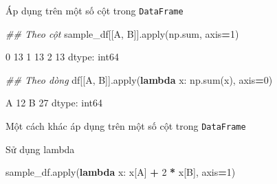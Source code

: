 \documentclass[
]{book}
\newenvironment{Shaded}{\begin{snugshade}}{\end{snugshade}}
\newcommand{\BuiltInTok}[1]{#1}
\newcommand{\CommentTok}[1]{\textcolor[rgb]{0.56,0.35,0.01}{\textit{#1}}}
\newcommand{\DecValTok}[1]{\textcolor[rgb]{0.00,0.00,0.81}{#1}}
\newcommand{\KeywordTok}[1]{\textcolor[rgb]{0.13,0.29,0.53}{\textbf{#1}}}
\newcommand{\NormalTok}[1]{#1}
\newcommand{\OperatorTok}[1]{\textcolor[rgb]{0.81,0.36,0.00}{\textbf{#1}}}
\newcommand{\StringTok}[1]{\textcolor[rgb]{0.31,0.60,0.02}{#1}}
\begin{document}
Áp dụng trên một số cột trong \texttt{DataFrame}

\begin{Shaded}
\begin{Highlighting}[]
\CommentTok{\#\# Theo cột}
\NormalTok{sample\_df[[}\StringTok{\textquotesingle{}A\textquotesingle{}}\NormalTok{, }\StringTok{\textquotesingle{}B\textquotesingle{}}\NormalTok{]].}\BuiltInTok{apply}\NormalTok{(np.}\BuiltInTok{sum}\NormalTok{, axis}\OperatorTok{=}\DecValTok{1}\NormalTok{)}
\end{Highlighting}
\end{Shaded}

\begin{Shaded}
\begin{Highlighting}[]
\NormalTok{0    13}
\NormalTok{1    13}
\NormalTok{2    13}
\NormalTok{dtype: int64}
\end{Highlighting}
\end{Shaded}

\begin{Shaded}
\begin{Highlighting}[]
\CommentTok{\#\# Theo dòng}
\NormalTok{df[[}\StringTok{\textquotesingle{}A\textquotesingle{}}\NormalTok{, }\StringTok{\textquotesingle{}B\textquotesingle{}}\NormalTok{]].}\BuiltInTok{apply}\NormalTok{(}\KeywordTok{lambda}\NormalTok{ x: np.}\BuiltInTok{sum}\NormalTok{(x), axis}\OperatorTok{=}\DecValTok{0}\NormalTok{)}
\end{Highlighting}
\end{Shaded}

\begin{Shaded}
\begin{Highlighting}[]
\NormalTok{A    12}
\NormalTok{B    27}
\NormalTok{dtype: int64}
\end{Highlighting}
\end{Shaded}

Một cách khác áp dụng trên một số cột trong \texttt{DataFrame}

Sử dụng lambda

\begin{Shaded}
\begin{Highlighting}[]
\NormalTok{sample\_df.}\BuiltInTok{apply}\NormalTok{(}\KeywordTok{lambda}\NormalTok{ x: x[}\StringTok{\textquotesingle{}A\textquotesingle{}}\NormalTok{] }\OperatorTok{+} \DecValTok{2} \OperatorTok{*}\NormalTok{ x[}\StringTok{\textquotesingle{}B\textquotesingle{}}\NormalTok{], axis}\OperatorTok{=}\DecValTok{1}\NormalTok{)}
\end{Highlighting}
\end{Shaded}
\end{document}
